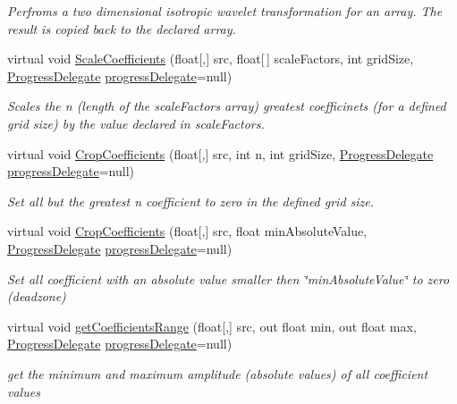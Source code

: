 \begin{DoxyCompactItemize}
\begin{DoxyCompactList}\small\item\em \-Perfroms a two dimensional isotropic wavelet transformation for an array. \-The result is copied back to the declared array. \end{DoxyCompactList}\item 
virtual void \hyperlink{class_turbo_wavelets_1_1_wavelet2_d_a55e3f96cb79da6cc4621ccc1118a0d6f}{\-Scale\-Coefficients} (float\mbox{[},\mbox{]} src, float\mbox{[}$\,$\mbox{]} scale\-Factors, int grid\-Size, \hyperlink{class_turbo_wavelets_1_1_wavelet2_d_aec52fe74aa08e073119064ef4ac3fe93}{\-Progress\-Delegate} \hyperlink{class_turbo_wavelets_1_1_wavelet2_d_a41d9135f22a6b2cb661b2cc2ccb768ff}{progress\-Delegate}=null)
\begin{DoxyCompactList}\small\item\em \-Scales the n (length of the scale\-Factors array) greatest coefficinets (for a defined grid size) by the value declared in scale\-Factors. \end{DoxyCompactList}\item 
virtual void \hyperlink{class_turbo_wavelets_1_1_wavelet2_d_aa1e399d2ab5f85843185a2895bf7f7ad}{\-Crop\-Coefficients} (float\mbox{[},\mbox{]} src, int n, int grid\-Size, \hyperlink{class_turbo_wavelets_1_1_wavelet2_d_aec52fe74aa08e073119064ef4ac3fe93}{\-Progress\-Delegate} \hyperlink{class_turbo_wavelets_1_1_wavelet2_d_a41d9135f22a6b2cb661b2cc2ccb768ff}{progress\-Delegate}=null)
\begin{DoxyCompactList}\small\item\em \-Set all but the greatest n coefficient to zero in the defined grid size. \end{DoxyCompactList}\item 
virtual void \hyperlink{class_turbo_wavelets_1_1_wavelet2_d_a9abbbf0cffd0d8dca5d78d6ad4dad399}{\-Crop\-Coefficients} (float\mbox{[},\mbox{]} src, float min\-Absolute\-Value, \hyperlink{class_turbo_wavelets_1_1_wavelet2_d_aec52fe74aa08e073119064ef4ac3fe93}{\-Progress\-Delegate} \hyperlink{class_turbo_wavelets_1_1_wavelet2_d_a41d9135f22a6b2cb661b2cc2ccb768ff}{progress\-Delegate}=null)
\begin{DoxyCompactList}\small\item\em \-Set all coefficient with an absolute value smaller then \char`\"{}min\-Absolute\-Value\char`\"{} to zero (deadzone) \end{DoxyCompactList}\item 
virtual void \hyperlink{class_turbo_wavelets_1_1_wavelet2_d_ad25227565f3b5e5953e951ad5b375654}{get\-Coefficients\-Range} (float\mbox{[},\mbox{]} src, out float min, out float max, \hyperlink{class_turbo_wavelets_1_1_wavelet2_d_aec52fe74aa08e073119064ef4ac3fe93}{\-Progress\-Delegate} \hyperlink{class_turbo_wavelets_1_1_wavelet2_d_a41d9135f22a6b2cb661b2cc2ccb768ff}{progress\-Delegate}=null)
\begin{DoxyCompactList}\small\item\em get the minimum and maximum amplitude (absolute values) of all coefficient values \end{DoxyCompactList}\end{DoxyCompactItemize}
